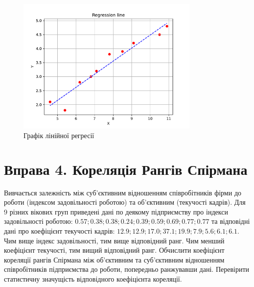 \documentclass{../hw_template}
\begin{document}
\begin{figure}
    \centering
    \includegraphics[width=0.8\textwidth]{regression_line.pdf}
    \caption{Графік лінійної регресії}
\end{figure}

\newpage

\section{Вправа 4. Кореляція Рангів Спірмана}

\begin{problem}
    Вивчається залежність між суб’єктивним відношенням співробітників фірми до
роботи (індексом задовільності роботою) та об’єктивним (текучості кадрів). Для 9
різних вікових груп приведені дані по деякому підприємству про індекси
задовільності роботою: $0.57; 0.38; 0.38; 0.24; 0.39; 0.59; 0.69; 0.77; 0.77$ та
відповідні дані про коефіцієнт текучості кадрів: $12.9; 12.9; 17.0; 37.1; 19.9;
7.9; 5.6; 6.1; 6.1$. Чим вище індекс задовільності, тим вище відповідний ранг.
Чим менший коефіцієнт текучості, тим вищий відповідний ранг. Обчислити
коефіцієнт кореляції рангів Спірмана між об’єктивним та суб’єктивним відношенням
співробітників підприємства до роботи, попередньо ранжувавши дані. Перевірити
статистичну значущість відповідного коефіцієнта кореляції.
\end{problem}
\end{document}
